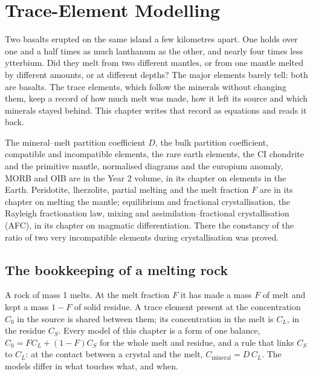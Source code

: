 \chapter{Trace-Element Modelling}\label{ch:b3:trace-element-modelling}

Two basalts erupted on the same island a few kilometres apart. One holds
over one and a half times as much lanthanum as the other, and nearly four times
less ytterbium. Did they melt from two different mantles, or from one mantle
melted by different amounts, or at different depths? The major elements
barely tell: both are basalts. The trace elements, which follow the minerals
without changing them, keep a record of how much melt was made, how it left
its source and which minerals stayed behind. This chapter writes that record
as equations and reads it back.

\begin{recall}
The mineral--melt partition coefficient $D$, the bulk partition coefficient,
compatible and incompatible elements, the rare earth elements, the CI
chondrite and the primitive mantle, normalised diagrams and the europium
anomaly, MORB and OIB are in the Year 2 volume, in its chapter on elements in
the Earth. Peridotite, lherzolite, partial melting and the melt fraction $F$
are in its chapter on melting the mantle; equilibrium and fractional
crystallisation, the Rayleigh fractionation law, mixing and
assimilation--fractional crystallisation (AFC), in its chapter on magmatic
differentiation. There the constancy of the ratio of two very incompatible
elements during crystallisation was proved.
\end{recall}

\section{The bookkeeping of a melting rock}\label{sec:b3:trace-element-modelling:balance}

A rock of mass 1 melts. At the melt fraction $F$ it has made a mass $F$ of
melt and kept a mass $1 - F$ of solid residue. A trace element present at the
concentration $C_0$ in the source is shared between them; its concentration
in the melt is $C_L$, in the residue $C_S$. Every model of this chapter is a
form of one balance, $C_0 = FC_L + (1 - F)C_S$ for the whole melt and residue,
and a rule that links $C_S$ to $C_L$: at the contact between a crystal and
the melt, $C_{\text{mineral}} = D\,C_L$. The models differ in what touches
what, and when.


